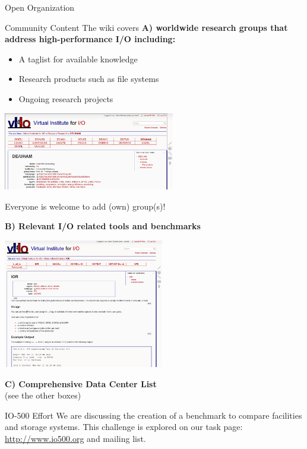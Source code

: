 \documentclass[portrait,a0paper,fontscale=0.4]{baposter}
\newcommand{\compresslist}{%
\setlength{\itemsep}{1pt}%
\setlength{\parskip}{0pt}%
\setlength{\parsep}{0pt}%
}
\begin{document}
\begin{poster}
\begin{posterbox}[name=overview,column=0,below=approach]{Open Organization}
\end{posterbox}


\begin{posterbox}[name=wps,column=0,below=overview, above=bottom]{Community Content}
The wiki covers \textbf{A) worldwide research groups that address high-performance I/O including:}

\vspace*{-1em}
\begin{itemize}\compresslist
\item A taglist for available knowledge
\item Research products such as file systems
\item Ongoing research projects
\end{itemize}

\vspace*{-0.5em}

\includegraphics[width=7.5cm]{groups}

Everyone is welcome to add (own) group(s)!

\textbf{B) Relevant I/O related tools and benchmarks}

\includegraphics[width=7cm]{benchmark}


\textbf{C) Comprehensive Data Center List} \\ (see the other boxes)

\medskip

\end{posterbox}


\begin{posterbox}[name=io500,column=1,span=2]{IO-500 Effort}
We are discussing the creation of a benchmark to compare facilities and storage systems. This challenge is explored on our task page: \url{http://www.io500.org} and mailing list.


\end{posterbox}
\end{poster}
\end{document}
